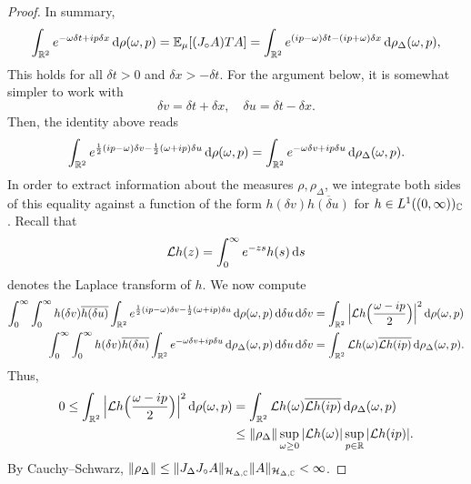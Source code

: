\begin{proof}
    In summary, 
    \begin{equation}
        \int_{\mathbb{R}^2} e^{-\omega \delta t + i p \delta x} \,\mathrm{d} \rho(\omega, p) = \mathbb{E}_\mu[(J_\circ A)T A ]=  \int_{\mathbb{R}^2} e^{(ip-\omega) \delta t - (ip+\omega) \delta x} \,\mathrm{d} \rho_\Delta(\omega,p),
    \end{equation}
    This holds for all $\delta t>0$ and $\delta x>-\delta t$. 
    For the argument below, it is somewhat simpler to work with 
    \begin{equation}
        \delta v=\delta t +\delta x,\quad \delta u=\delta t-\delta x.
    \end{equation}
    Then, the identity above reads
    \begin{equation}
        \int_{\mathbb{R}^2} e^{\frac{1}{2}(ip-\omega)\delta v - \frac{1}{2} (\omega+ip)\delta u } \,\mathrm{d} \rho(\omega, p) = \int_{\mathbb{R}^2} e^{-\omega \delta v +i p \delta u} \,\mathrm{d} \rho_\Delta(\omega,p).
    \end{equation}
    In order to extract information about the measures $\rho,\rho_\Delta$,
    we integrate both sides of this equality against a function of the
    form $h(\delta v)\overline{h(\delta u)}$ for
    $h\in L^1((0,\infty))_{\mathbb{C}}$. Recall that 
    \begin{equation}
        \mathcal{L} h(z) = \int_0^\infty e^{-zs} h(s) \,\mathrm{d} s 
    \end{equation}
    denotes the Laplace transform of $h$. We now compute 
    \begin{align}
        \int_0^\infty \int_0^\infty h(\delta v) \overline{h(\delta u)} \int_{\mathbb{R}^2} e^{\frac{1}{2}(ip-\omega)\delta v - \frac{1}{2} (\omega+ip)\delta u } \,\mathrm{d} \rho(\omega, p)  \,\mathrm{d} \delta u \,\mathrm{d} \delta v &= \int_{\mathbb{R}^2} \Big|\mathcal{L} h\Big(\frac{\omega-ip}{2}\Big)\Big|^2  \,\mathrm{d} \rho(\omega,p) \\ 
        \int_0^\infty \int_0^\infty  h(\delta v) \overline{h (\delta u)}\int_{\mathbb{R}^2} e^{-\omega \delta v +i p \delta u} \,\mathrm{d} \rho_\Delta(\omega,p) \,\mathrm{d} \delta u \,\mathrm{d} \delta v &= \int_{\mathbb{R}^2} \mathcal{L} h(\omega)\overline{\mathcal{L} h(ip)} \,\mathrm{d} \rho_\Delta(\omega,p) .
    \end{align}
    Thus, 
    \begin{align}\begin{split} 
        0 \leq \int_{\mathbb{R}^2} \Big|\mathcal{L} h\Big(\frac{\omega-ip}{2}\Big)\Big|^2  \,\mathrm{d} \rho(\omega,p) &= \int_{\mathbb{R}^2} \mathcal{L} h(\omega)\overline{\mathcal{L} h(ip)} \,\mathrm{d} \rho_\Delta(\omega,p) \\
        &\leq \lVert \rho_\Delta \rVert \sup_{\omega\geq 0} |\mathcal{L} h(\omega) |  \sup_{p\in \mathbb{R}} |\mathcal{L} h(ip)|.
        \end{split} 
    \end{align}
    By Cauchy--Schwarz, $\lVert \rho_\Delta \rVert \leq \lVert J_\Delta J_\circ A\rVert_{\mathcal{H}_{\Delta,\mathbb{C}}}\lVert A \rVert_{\mathcal{H}_{\Delta,\mathbb{C}}}<\infty$. 


\end{proof}
